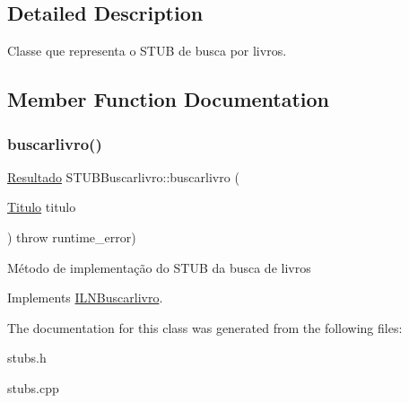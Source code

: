 \subsection{Detailed Description}
Classe que representa o S\+T\+UB de busca por livros. 

\subsection{Member Function Documentation}
\mbox{\label{classSTUBBuscarlivro_a1c3d0080a08f2e9e7bc57454497b3eca}} 
\subsubsection{\texorpdfstring{buscarlivro()}{buscarlivro()}}
{\footnotesize\ttfamily \hyperlink{classResultado}{Resultado} S\+T\+U\+B\+Buscarlivro\+::buscarlivro (\begin{DoxyParamCaption}\item[{\hyperlink{classTitulo}{Titulo}}]{titulo }\end{DoxyParamCaption}) throw  runtime\+\_\+error) \hspace{0.3cm}{\ttfamily [virtual]}}

Método de implementação do S\+T\+UB da busca de livros 

Implements \hyperlink{classILNBuscarlivro}{I\+L\+N\+Buscarlivro}.



The documentation for this class was generated from the following files\+:\begin{DoxyCompactItemize}
\item 
stubs.\+h\item 
stubs.\+cpp\end{DoxyCompactItemize}
